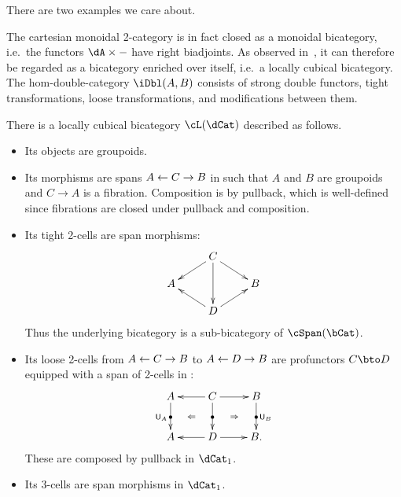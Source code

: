 \documentclass{amsart}
\newcommand{\hunit}[1]{\mathsf{U}_{#1}}
\begin{document}
There are two examples we care about.

\begin{eg}
  The cartesian monoidal 2-category \cDbl is in fact closed as a monoidal bicategory, i.e.\ the functors $\dA\times -$ have right biadjoints.
  As observed in~\cite{gg:lowdim-tricats}, it can therefore be regarded as a bicategory enriched over itself, i.e.\ a locally cubical bicategory.
  The hom-double-category $\iDbl(A,B)$ consists of strong double functors, tight transformations, loose transformations, and modifications between them.
\end{eg}

\begin{thm}
  There is a locally cubical bicategory $\cL(\dCat)$ described as follows.
  \begin{itemize}
  \item Its objects are groupoids.
  \item Its morphisms are spans $A \leftarrow C \to B$ in \bCat such that $A$ and $B$ are groupoids and $C\to A$ is a fibration.
    Composition is by pullback, which is well-defined since fibrations are closed under pullback and composition.
  \item Its tight 2-cells are span morphisms:
    \[ \xymatrix@R=1pc{ & C \ar[dl] \ar[dr] \ar[dd] \\ A && B \\ &D \ar[ul] \ar[ur] } \]
    Thus the underlying bicategory is a sub-bicategory of $\cSpan(\bCat)$.
  \item Its loose 2-cells from $A \leftarrow C \to B$ to $A\leftarrow D \to B$ are profunctors $C\bto D$ equipped with a span of 2-cells in \dCat:
    \[ \xymatrix{ A \ar[d]|{\bullet}_{\hunit A} \ar@{}[dr]|{\Leftarrow} &
      C \ar[l] \ar[d]|{\bullet} \ar[r] \ar@{}[dr]|{\Rightarrow} &
      B \ar[d]|{\bullet}^{\hunit B}\\
      A & D \ar[l] \ar[r] & B. } \]
    These are composed by pullback in $\dCat_1$.
  \item Its 3-cells are span morphisms in $\dCat_1$.
  \end{itemize}
\end{thm}
\end{document}
